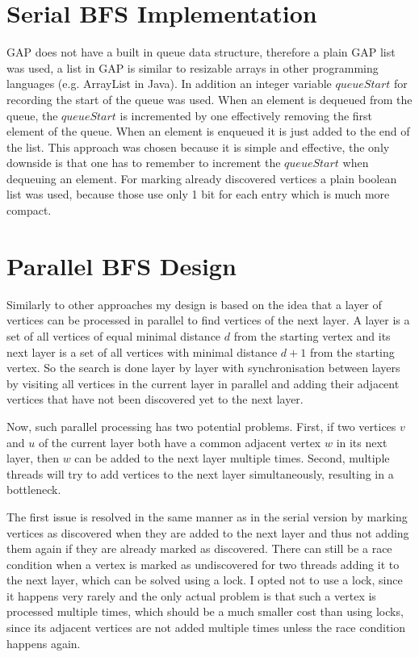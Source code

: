 \documentclass{report}
\theoremstyle{plain}
\theoremstyle{definition}
\theoremstyle{remark}
\begin{document}
\section{Serial BFS Implementation}

GAP does not have a built in queue data structure, therefore a plain GAP list was used, a list in GAP is similar to resizable arrays in other programming languages (e.g. ArrayList in Java). In addition an integer variable $queueStart$ for recording the start of the queue was used. When an element is dequeued from the queue, the $queueStart$ is incremented by one effectively removing the first element of the queue. When an element is enqueued it is just added to the end of the list. This approach was chosen because it is simple and effective, the only downside is that one has to remember to increment the $queueStart$ when dequeuing an element. For marking already discovered vertices a plain boolean list was used, because those use only 1 bit for each entry which is much more compact.

\section{Parallel BFS Design}

Similarly to other approaches my design is based on the idea that a layer of vertices can be processed in parallel to find vertices of the next layer. A layer is a set of all vertices of equal minimal distance $d$ from the starting vertex and its next layer is a set of all vertices with minimal distance $d + 1$ from the starting vertex. So the search is done layer by layer with synchronisation between layers by visiting all vertices in the current layer in parallel and adding their adjacent vertices that have not been discovered yet to the next layer.

Now, such parallel processing has two potential problems. First, if two vertices $v$ and $u$ of the current layer both have a common adjacent vertex $w$ in its next layer, then $w$ can be added to the next layer multiple times. Second, multiple threads will try to add vertices to the next layer simultaneously, resulting in a bottleneck.

The first issue is resolved in the same manner as in the serial version by marking vertices as discovered when they are added to the next layer and thus not adding them again if they are already marked as discovered. There can still be a race condition when a vertex is marked as undiscovered for two threads adding it to the next layer, which can be solved using a lock. I opted not to use a lock, since it happens very rarely and the only actual problem is that such a vertex is processed multiple times, which should be a much smaller cost than using locks, since its adjacent vertices are not added multiple times unless the race condition happens again.
\end{document}
